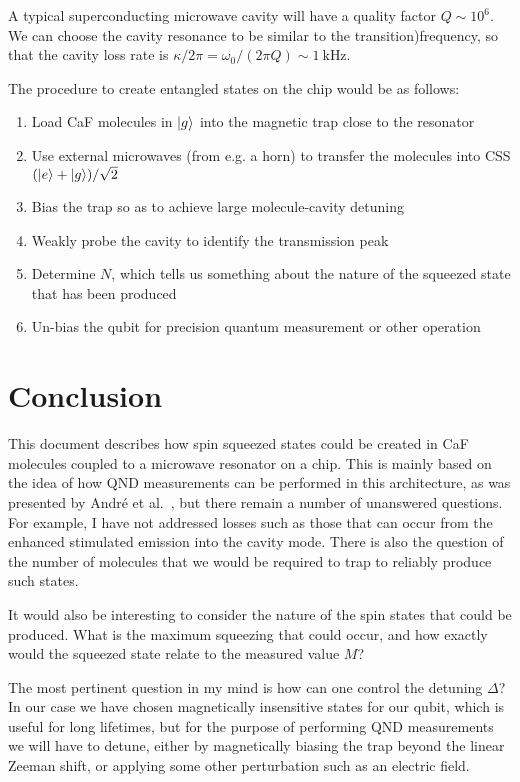 \documentclass{article}
\begin{document}
A typical superconducting microwave cavity will have a quality factor
$Q\sim10^6$. We can choose the cavity resonance to be similar to the
transition)frequency, so that the cavity loss rate is $\kappa/2\pi =
\omega_0/(2\pi Q) \sim \SI{1}{\kilo\hertz}$. 

The procedure to create entangled states on the chip would be as follows:

\begin{enumerate}
  \item Load CaF molecules in $\ket{g}$ into the magnetic trap close to the
    resonator
  \item Use external microwaves (from e.g. a horn) to transfer the molecules
    into CSS $(\ket{e} + \ket{g})/\sqrt{2}$
  \item Bias the trap so as to achieve large molecule-cavity detuning
  \item Weakly probe the cavity to identify the transmission peak
  \item Determine $N$, which tells us something about the nature of the
    squeezed state that has been produced
  \item Un-bias the qubit for precision quantum measurement or other operation
\end{enumerate}

\section{Conclusion}

This document describes how spin squeezed states could be created in CaF
molecules coupled to a microwave resonator on a chip. This is mainly based on
the idea of how QND measurements can be performed in this architecture, as was
presented by Andr\'e et al.~\cite{Andre2006}, but there remain a number of
unanswered questions. For example, I have not addressed losses such as those
that can occur from the enhanced stimulated emission into the cavity mode.
There is also the question of the number of molecules that we would be required
to trap to reliably produce such states.

It would also be interesting to consider the nature of the spin states that
could be produced. What is the maximum squeezing that could occur, and how
exactly would the squeezed state relate to the measured value $M$?

The most pertinent question in my mind is how can one control the detuning
$\Delta$? In our case we have chosen magnetically insensitive states for our
qubit, which is useful for long lifetimes, but for the purpose of performing
QND measurements we will have to detune, either by magnetically biasing the
trap beyond the linear Zeeman shift, or applying some other perturbation
such as an electric field.
\end{document}
